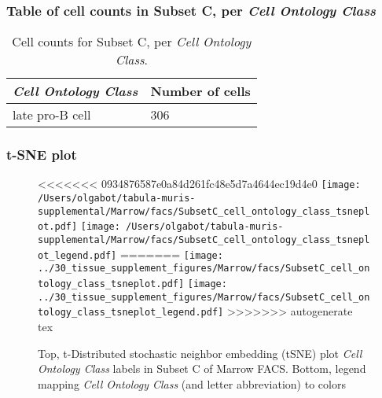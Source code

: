 \subsubsection{Table of cell counts in Subset C, per \emph{Cell Ontology Class}}\begin{table}[h]
\centering
\label{my-label}
\begin{tabular}{@{}ll@{}}
\toprule

\emph{Cell Ontology Class}& Number of cells \\ \midrule
late pro-B cell & 306 \\
\bottomrule
\end{tabular}
\caption{Cell counts for Subset C, per \emph{Cell Ontology Class}.}
\end{table}

\clearpage
\subsubsection{t-SNE plot}
\begin{figure}[h]
\centering
<<<<<<< 0934876587e0a84d261fc48e5d7a4644ec19d4e0
\texttt{[image: /Users/olgabot/tabula-muris-supplemental/Marrow/facs/SubsetC\_cell\_ontology\_class\_tsneplot.pdf]}
\texttt{[image: /Users/olgabot/tabula-muris-supplemental/Marrow/facs/SubsetC\_cell\_ontology\_class\_tsneplot\_legend.pdf]}
=======
\texttt{[image: ../30\_tissue\_supplement\_figures/Marrow/facs/SubsetC\_cell\_ontology\_class\_tsneplot.pdf]}
\texttt{[image: ../30\_tissue\_supplement\_figures/Marrow/facs/SubsetC\_cell\_ontology\_class\_tsneplot\_legend.pdf]}
>>>>>>> autogenerate tex
\caption{Top, t-Distributed stochastic neighbor embedding (tSNE) plot  \emph{Cell Ontology Class} labels in Subset C of Marrow FACS. Bottom, legend mapping \emph{Cell Ontology Class} (and letter abbreviation) to colors}
\end{figure}


\clearpage

